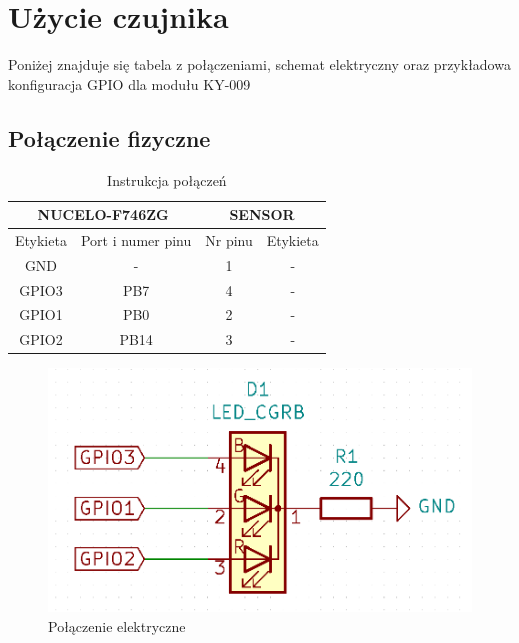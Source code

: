 \documentclass[11pt, a4paper]{article}
\begin{document}
\section*{Użycie czujnika}

Poniżej znajduje się tabela z połączeniami, schemat elektryczny oraz przykładowa konfiguracja GPIO dla modułu KY-009 

\subsection*{Połączenie fizyczne}

\vspace{0.5cm}
\begin{table}[h!]
    \centering
    \begin{tabular}{|c|c|c|c|} 
        \hline
        \multicolumn{2}{|c|}{NUCELO-F746ZG} & \multicolumn{2}{c|}{SENSOR}  \\ 
        \hline
        Etykieta & Port i numer pinu       & Nr pinu & Etykieta           \\ 
        \hline
        GND      & -                       & 1       & -              \\
        GPIO3    & PB7                     & 4       & -              \\
        GPIO1    & PB0                     & 2       & -              \\
        GPIO2    & PB14                     & 3       & -              \\
        \hline
    \end{tabular}
    \caption{Instrukcja połączeń}
\end{table}
\vspace{0.5cm}

\vspace{0.5cm}
\begin{figure}[h!]
    \centering
    \includegraphics[width=12cm]{fig/KY-009/polaczenie_modulu/polaczenie.png}
    \caption{Połączenie elektryczne}
    \label{fig:my_label}
\end{figure}
\vspace{0.5cm}
\end{document}
